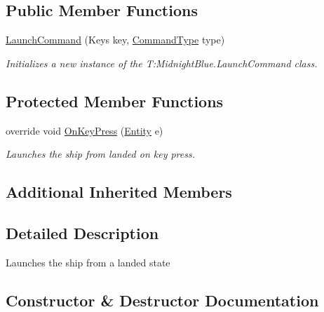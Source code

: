\subsection*{Public Member Functions}
\begin{DoxyCompactItemize}
\item 
\hyperlink{class_midnight_blue_1_1_launch_command_af557e1d21514b76f8adb28fd5c43d279}{Launch\+Command} (Keys key, \hyperlink{namespace_m_b2_d_1_1_i_o_ab5f95f3fe9e652778b62bdf943168a68}{Command\+Type} type)
\begin{DoxyCompactList}\small\item\em Initializes a new instance of the T\+:\+Midnight\+Blue.\+Launch\+Command class. \end{DoxyCompactList}\end{DoxyCompactItemize}
\subsection*{Protected Member Functions}
\begin{DoxyCompactItemize}
\item 
override void \hyperlink{class_midnight_blue_1_1_launch_command_a5da2fdd898111ea59f4f63126c380a3e}{On\+Key\+Press} (\hyperlink{class_m_b2_d_1_1_entity_component_1_1_entity}{Entity} e)
\begin{DoxyCompactList}\small\item\em Launches the ship from landed on key press. \end{DoxyCompactList}\end{DoxyCompactItemize}
\subsection*{Additional Inherited Members}


\subsection{Detailed Description}
Launches the ship from a landed state 



\subsection{Constructor \& Destructor Documentation}
\hypertarget{class_midnight_blue_1_1_launch_command_af557e1d21514b76f8adb28fd5c43d279}{}\label{class_midnight_blue_1_1_launch_command_af557e1d21514b76f8adb28fd5c43d279} 

